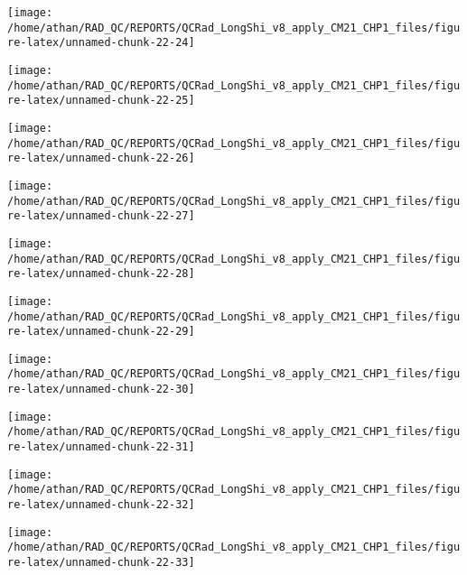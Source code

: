 \documentclass[
  10pt,
  a4paper,oneside]{article}
\begin{document}
\begin{center}\texttt{[image: /home/athan/RAD\_QC/REPORTS/QCRad\_LongShi\_v8\_apply\_CM21\_CHP1\_files/figure-latex/unnamed-chunk-22-24]} \end{center}

\begin{center}\texttt{[image: /home/athan/RAD\_QC/REPORTS/QCRad\_LongShi\_v8\_apply\_CM21\_CHP1\_files/figure-latex/unnamed-chunk-22-25]} \end{center}

\begin{center}\texttt{[image: /home/athan/RAD\_QC/REPORTS/QCRad\_LongShi\_v8\_apply\_CM21\_CHP1\_files/figure-latex/unnamed-chunk-22-26]} \end{center}

\begin{center}\texttt{[image: /home/athan/RAD\_QC/REPORTS/QCRad\_LongShi\_v8\_apply\_CM21\_CHP1\_files/figure-latex/unnamed-chunk-22-27]} \end{center}

\begin{center}\texttt{[image: /home/athan/RAD\_QC/REPORTS/QCRad\_LongShi\_v8\_apply\_CM21\_CHP1\_files/figure-latex/unnamed-chunk-22-28]} \end{center}

\begin{center}\texttt{[image: /home/athan/RAD\_QC/REPORTS/QCRad\_LongShi\_v8\_apply\_CM21\_CHP1\_files/figure-latex/unnamed-chunk-22-29]} \end{center}

\begin{center}\texttt{[image: /home/athan/RAD\_QC/REPORTS/QCRad\_LongShi\_v8\_apply\_CM21\_CHP1\_files/figure-latex/unnamed-chunk-22-30]} \end{center}

\begin{center}\texttt{[image: /home/athan/RAD\_QC/REPORTS/QCRad\_LongShi\_v8\_apply\_CM21\_CHP1\_files/figure-latex/unnamed-chunk-22-31]} \end{center}

\begin{center}\texttt{[image: /home/athan/RAD\_QC/REPORTS/QCRad\_LongShi\_v8\_apply\_CM21\_CHP1\_files/figure-latex/unnamed-chunk-22-32]} \end{center}

\begin{center}\texttt{[image: /home/athan/RAD\_QC/REPORTS/QCRad\_LongShi\_v8\_apply\_CM21\_CHP1\_files/figure-latex/unnamed-chunk-22-33]} \end{center}
\end{document}
